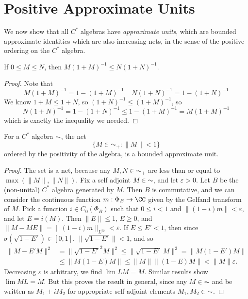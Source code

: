\section{Positive Approximate Units}

We now show that all $C^*$ algebras have \emph{approximate units}, which are bounded approximate identities which are also increasing nets, in the sense of the positive ordering on the $C^*$ algebra.

\begin{lemma}
    If $0 \leq M \leq N$, then $M(1 + M)^{-1} \leq N(1 + N)^{-1}$.
\end{lemma}
\begin{proof}
    Note that
    \[ M(1 + M)^{-1} = 1 - (1 + M)^{-1}\ \ \ \ \ N(1 + N)^{-1} = 1 - (1 + N)^{-1} \]
    We know $1 + M \leq 1 + N$, so $(1 + N)^{-1} \leq (1 + M)^{-1}$, so
    \[ N(1 + N)^{-1} = 1-(1 + N)^{-1} \leq 1-(1 + M)^{-1} = M(1 + M)^{-1} \]
    which is exactly the inequality we needed.
\end{proof}

\begin{prop}
    For a $C^*$ algebra $\AC$, the net
    \[ \{ M \in \AC_+ : \| M \| < 1 \} \]
    ordered by the positivity of the algebra, is a bounded approximate unit.
\end{prop}
\begin{proof}
    The set is a net, because any $M,N \in \AC_+$ are less than or equal to $\max(\|M\|,\|N\|)$. Fix a self adjoint $M \in \AC$, and let $\varepsilon > 0$. Let $B$ be the (non-unital) $C^*$ algebra generated by $M$. Then $B$ is commutative, and we can consider the continuous function $m: \Phi_B \to \CC$ given by the Gelfand transform of $M$. Pick a function $i \in C_0(\Phi_B)$ such that $0 \leq i < 1$ and $\| (1 - i) m \| < \varepsilon$, and let $E = i(M)$. Then $\| E \| \leq 1$, $E \geq 0$, and $\| M - ME \| = \| (1 - i) m \|_{L^\infty} < \varepsilon$. If $E \leq E' < 1$, then since $\sigma(\sqrt{1 - E'}) \in [0,1]$, $\| \sqrt{1 - E'} \| < 1$, and so
    \begin{align*}
        \| M - E'M \|^2 &= \| \sqrt{1 - E'}^2 M \|^2 \leq \| \sqrt{1 - E'}\ M \|^2 = \| M(1 - E')M \|\\
        &\leq \| M(1 - E)M \| \leq \| M \| \| (1 - E)M \| < \| M \| \varepsilon.
    \end{align*}
    Decreasing $\varepsilon$ is arbitrary, we find $\lim LM = M$. Similar results show $\lim ML = M$. But this proves the result in general, since any $M \in \AC$ and be written as $M_1 + i M_2$ for appropriate self-adjoint elements $M_1,M_2 \in \AC$.
\end{proof}

